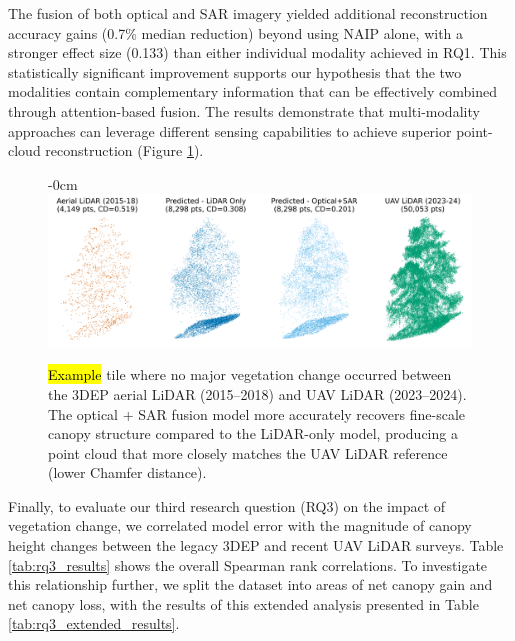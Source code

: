 \documentclass[remotesensing,article,accept,pdftex,moreauthors]{Definitions/mdpi}
\begin{document}
The fusion of both optical and SAR imagery yielded additional reconstruction accuracy gains (0.7\% median reduction) beyond using NAIP alone, with a stronger effect size (0.133) than either individual modality achieved in RQ1. This statistically significant improvement supports our hypothesis that the two modalities contain complementary information that can be effectively combined through attention-based fusion. The results demonstrate that multi-modality approaches can leverage different sensing capabilities to achieve superior point-cloud reconstruction (Figure \ref{fig:model_output_example}).


\vspace{-3pt}


\begin{figure}[H]
\begin{adjustwidth}{-\extralength}{0cm}
\centering
    \includegraphics[width=0.9\linewidth]{figures/model_output_example.png}
    \end{adjustwidth}
    \caption{\hl{Example} %
 tile where no major vegetation change occurred between the 3DEP aerial LiDAR (2015--2018) and UAV LiDAR (2023--2024). The optical + SAR fusion model more accurately recovers fine-scale canopy structure compared to the LiDAR-only model, producing a point cloud that more closely matches the UAV LiDAR reference (lower Chamfer distance).}
    \label{fig:model_output_example}
\end{figure} 




Finally, to evaluate our third research question (RQ3) on the impact of vegetation change, we correlated model error with the magnitude of canopy height changes between the legacy 3DEP and recent UAV LiDAR surveys. Table \ref{tab:rq3_results} shows the overall Spearman rank correlations. To investigate this relationship further, we split the dataset into areas of net canopy gain and net canopy loss, with the results of this extended analysis presented in Table \ref{tab:rq3_extended_results}.
\end{document}
